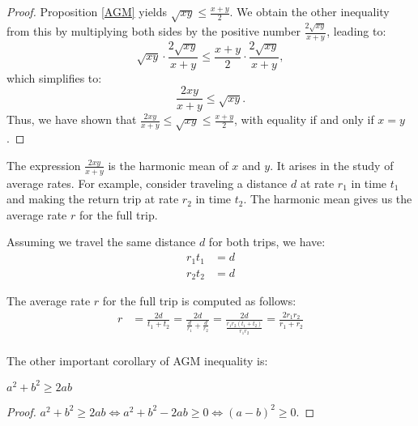 \begin{proof}
Proposition \ref{AGM} yields $\sqrt{xy} \leq \frac{x+y}{2}$. We obtain the other inequality from this by multiplying both sides by the positive number $\frac{2\sqrt{xy}}{x+y}$, leading to:
\[\sqrt{xy} \cdot \frac{2\sqrt{xy}}{x+y} \leq \frac{x+y}{2} \cdot \frac{2\sqrt{xy}}{x+y},\]
which simplifies to:
\[\frac{2xy}{x+y} \leq \sqrt{xy}.\]
Thus, we have shown that $\frac{2xy}{x+y} \leq \sqrt{xy} \leq \frac{x+y}{2}$, with equality if and only if $x = y$.
\end{proof}
The expression $\frac{2xy}{x+y}$ is the harmonic mean of $x$ and $y$. It arises in the study of average rates. For example, consider traveling a distance $d$ at rate $r_1$ in time $t_1$ and making the return trip at rate $r_2$ in time $t_2$. The harmonic mean gives us the average rate $r$ for the full trip.

Assuming we travel the same distance $d$ for both trips, we have:
\begin{align*}
r_1t_1 &= d \\
r_2t_2 &= d
\end{align*}

The average rate $r$ for the full trip is computed as follows:
\begin{align*}
r &= \frac{2d}{t_1 + t_2} = \frac{2d}{\frac{d}{r_1} + \frac{d}{r_2}} = \frac{2d}{\frac{r_1r_2(t_1 + t_2)}{r_1r_2}} =\frac{2r_1r_2}{r_1 + r_2}\\
\end{align*}

The other important corollary of AGM inequality is:
\begin{corollary}
    $a^2+b^2 \geq 2ab$
\end{corollary}
\begin{proof}
    $a^2 + b^2 \geq 2ab \iff a^2 + b^2 - 2ab \geq 0 \iff (a - b)^2 \geq 0.$
\end{proof}


